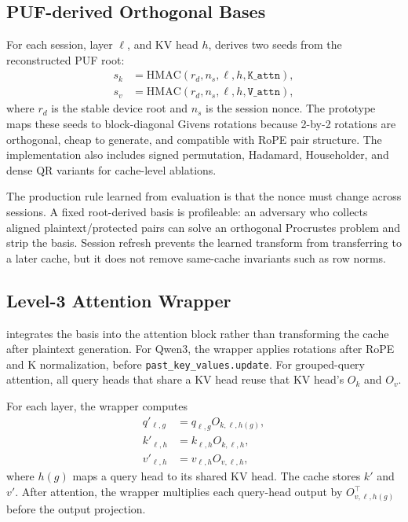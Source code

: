\subsection{PUF-derived Orthogonal Bases}

For each session, layer $\ell$, and KV head $h$, \sys{} derives two seeds from the reconstructed PUF root:
\begin{align}
    s_k &= \mathrm{HMAC}(r_d, n_s, \ell, h, \texttt{K\_attn}), \\
    s_v &= \mathrm{HMAC}(r_d, n_s, \ell, h, \texttt{V\_attn}),
\end{align}
where $r_d$ is the stable device root and $n_s$ is the session nonce. The prototype maps these seeds to block-diagonal Givens rotations because 2-by-2 rotations are orthogonal, cheap to generate, and compatible with RoPE pair structure. The implementation also includes signed permutation, Hadamard, Householder, and dense QR variants for cache-level ablations.

The production rule learned from evaluation is that the nonce must change across sessions. A fixed root-derived basis is profileable: an adversary who collects aligned plaintext/protected pairs can solve an orthogonal Procrustes problem and strip the basis. Session refresh prevents the learned transform from transferring to a later cache, but it does not remove same-cache invariants such as row norms.

\subsection{Level-3 Attention Wrapper}

\sys{} integrates the basis into the attention block rather than transforming the cache after plaintext generation. For Qwen3, the wrapper applies rotations after RoPE and K normalization, before \texttt{past\_key\_values.update}. For grouped-query attention, all query heads that share a KV head reuse that KV head's $O_k$ and $O_v$.

For each layer, the wrapper computes
\begin{align}
    q'_{\ell,g} &= q_{\ell,g}O_{k,\ell,h(g)}, \\
    k'_{\ell,h} &= k_{\ell,h}O_{k,\ell,h}, \\
    v'_{\ell,h} &= v_{\ell,h}O_{v,\ell,h},
\end{align}
where $h(g)$ maps a query head to its shared KV head. The cache stores $k'$ and $v'$. After attention, the wrapper multiplies each query-head output by $O_{v,\ell,h(g)}^\top$ before the output projection.

